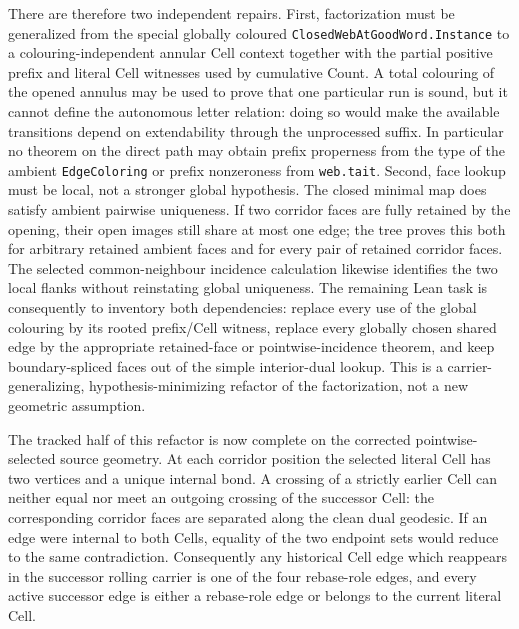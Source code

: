 There are therefore two independent repairs.  First, factorization must be
generalized from the special globally coloured
\texttt{ClosedWebAtGoodWord.Instance} to a colouring-independent annular Cell
context together with the partial positive prefix and literal Cell witnesses
used by cumulative Count.  A total colouring of the opened annulus may be
used to prove that one particular run is sound, but it cannot define the
autonomous letter relation: doing so would make the available transitions
depend on extendability through the unprocessed suffix.  In particular no
theorem on the direct path may obtain prefix properness from the type of the
ambient \texttt{EdgeColoring} or prefix nonzeroness from \texttt{web.tait}.
Second, face lookup must be local, not a stronger global hypothesis.  The
closed minimal map does satisfy ambient pairwise uniqueness.
If two corridor faces are fully retained by the opening, their open images
still share at most one edge; the tree proves this both for arbitrary retained
ambient faces and for every pair of retained corridor faces.
The selected common-neighbour incidence calculation likewise identifies the
two local flanks without reinstating global uniqueness.
The remaining Lean task is consequently to inventory both dependencies:
replace every use of the global colouring by its rooted prefix/Cell witness,
replace every globally chosen shared edge by the appropriate retained-face or
pointwise-incidence theorem, and keep boundary-spliced faces out of the simple
interior-dual lookup.  This is a carrier-generalizing,
hypothesis-minimizing refactor of the factorization, not a new geometric
assumption.

The tracked half of this refactor is now complete on the corrected
pointwise-selected source geometry.  At each corridor position the selected
literal Cell has two vertices and a unique internal bond.  A crossing of a
strictly earlier Cell can neither equal nor meet an outgoing crossing of the
successor Cell: the corresponding corridor faces are separated along the
clean dual geodesic.  If an edge were internal to both Cells, equality of the
two endpoint sets would reduce to the same contradiction.  Consequently any
historical Cell edge which reappears in the successor rolling carrier is one
of the four rebase-role edges, and every active successor edge is either a
rebase-role edge or belongs to the current literal Cell.

